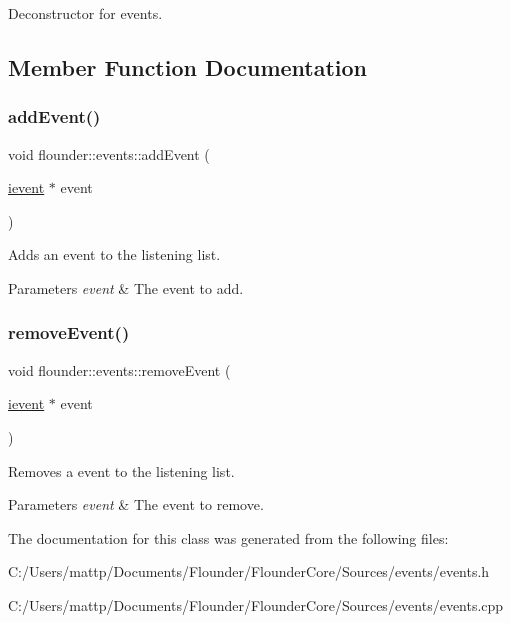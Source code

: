 Deconstructor for events. 



\subsection{Member Function Documentation}
\mbox{\label{classflounder_1_1events_a6cb8ff41cf2fbf6a92ca78c122f07eb9}} 
\subsubsection{\texorpdfstring{add\+Event()}{addEvent()}}
{\footnotesize\ttfamily void flounder\+::events\+::add\+Event (\begin{DoxyParamCaption}\item[{\hyperlink{classflounder_1_1ievent}{ievent} $\ast$}]{event }\end{DoxyParamCaption})}



Adds an event to the listening list. 


\begin{DoxyParams}{Parameters}
{\em event} & The event to add. \\
\hline
\end{DoxyParams}
\mbox{\label{classflounder_1_1events_a957a88d282b2caa50cc87bbe039de095}} 
\subsubsection{\texorpdfstring{remove\+Event()}{removeEvent()}}
{\footnotesize\ttfamily void flounder\+::events\+::remove\+Event (\begin{DoxyParamCaption}\item[{\hyperlink{classflounder_1_1ievent}{ievent} $\ast$}]{event }\end{DoxyParamCaption})}



Removes a event to the listening list. 


\begin{DoxyParams}{Parameters}
{\em event} & The event to remove. \\
\hline
\end{DoxyParams}


The documentation for this class was generated from the following files\+:\begin{DoxyCompactItemize}
\item 
C\+:/\+Users/mattp/\+Documents/\+Flounder/\+Flounder\+Core/\+Sources/events/events.\+h\item 
C\+:/\+Users/mattp/\+Documents/\+Flounder/\+Flounder\+Core/\+Sources/events/events.\+cpp\end{DoxyCompactItemize}
